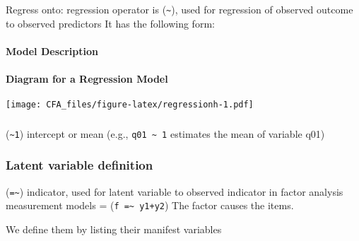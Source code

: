 \documentclass[
]{article}
\newenvironment{Shaded}{\begin{snugshade}}{\end{snugshade}}
\newcommand{\FunctionTok}[1]{\textcolor[rgb]{0.00,0.00,0.00}{#1}}
\newcommand{\NormalTok}[1]{#1}
\newcommand{\OtherTok}[1]{\textcolor[rgb]{0.56,0.35,0.01}{#1}}
\newcommand{\SpecialCharTok}[1]{\textcolor[rgb]{0.00,0.00,0.00}{#1}}
\newcommand{\StringTok}[1]{\textcolor[rgb]{0.31,0.60,0.02}{#1}}
\begin{document}
Regress onto: regression operator is (\texttt{\textasciitilde{}}), used
for regression of observed outcome to observed predictors It has the
following form:

\hypertarget{model-description}{%
\paragraph{Model Description}\label{model-description}}

\begin{Shaded}
\end{Shaded}

\hypertarget{diagram-for-a-regression-model}{%
\paragraph{Diagram for a Regression
Model}\label{diagram-for-a-regression-model}}

\texttt{[image: CFA\_files/figure-latex/regressionh-1.pdf]}

\hypertarget{section-2}{%
\subsubsection*{}\label{section-2}}

(\texttt{\textasciitilde{}1}) intercept or mean (e.g.,
\texttt{q01\ \textasciitilde{}\ 1} estimates the mean of variable q01)

\hypertarget{latent-variable-definition}{%
\subsubsection{Latent variable
definition}\label{latent-variable-definition}}

(\texttt{=\textasciitilde{}}) indicator, used for latent variable to
observed indicator in factor analysis measurement models =
(\texttt{f\ =\textasciitilde{}\ y1+y2}) The factor causes the items.

We define them by listing their manifest variables
\end{document}
